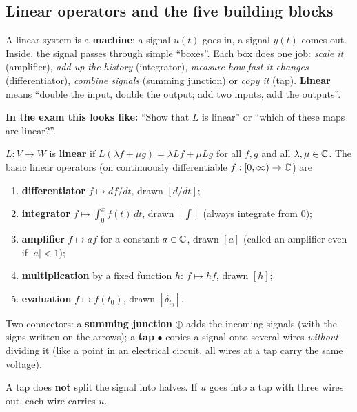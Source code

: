\subsection{Linear operators and the five building blocks \texorpdfstring{}{}}\label{ss:1-1}
\begin{plainbox}
A linear system is a \textbf{machine}: a signal $u(t)$ goes in, a signal $y(t)$ comes out. Inside, the signal passes through
simple ``boxes''. Each box does one job: \emph{scale it} (amplifier), \emph{add up the history} (integrator), \emph{measure how fast it changes}
(differentiator), \emph{combine signals} (summing junction) or \emph{copy it} (tap).
\textbf{Linear} means ``double the input, double the output; add two inputs, add the outputs''.
\par\smallskip\textbf{In the exam this looks like:} ``Show that $L$ is linear'' or ``which of these maps are linear?''.
\end{plainbox}
\begin{defbox}
$L:V\to W$ is \textbf{linear} if $L(\lambda f+\mu g)=\lambda Lf+\mu Lg$ for all $f,g$ and all $\lambda,\mu\in\mathbb{C}$.
The basic linear operators (on continuously differentiable $f:[0,\infty)\to\mathbb{C}$) are
\begin{enumerate}[label=(\roman*)]
\item \textbf{differentiator} $f\mapsto df/dt$, drawn $[d/dt]$;
\item \textbf{integrator} $f\mapsto\int_0^x f(t)\,dt$, drawn $[\int]$ (always integrate from $0$);
\item \textbf{amplifier} $f\mapsto af$ for a constant $a\in\mathbb{C}$, drawn $[a]$ (called an amplifier even if $|a|<1$);
\item \textbf{multiplication} by a fixed function $h$: $f\mapsto hf$, drawn $[h]$;
\item \textbf{evaluation} $f\mapsto f(t_0)$, drawn $[\delta_{t_0}]$.
\end{enumerate}
Two connectors: a \textbf{summing junction} $\oplus$ adds the incoming signals (with the signs written on the arrows);
a \textbf{tap} $\bullet$ copies a signal onto several wires \emph{without} dividing it (like a point in an electrical circuit,
all wires at a tap carry the same voltage).
\end{defbox}

\begin{warnbox}
A tap does \textbf{not} split the signal into halves. If $u$ goes into a tap with three wires out, each wire carries $u$.
\end{warnbox}

